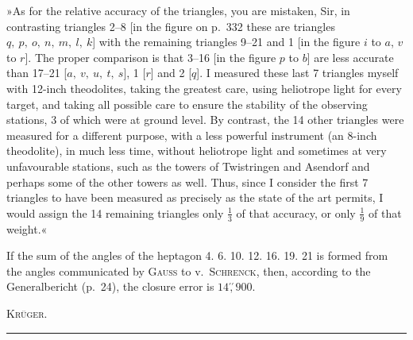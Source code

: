 \par\noindent\hspace*{\parindent}»As for the relative accuracy of the triangles, you are mistaken, Sir, in contrasting triangles 2--8 [in the figure on p.~332 these are triangles \(q,\ p,\ o,\ n,\ m,\ l,\ k\)] with the remaining triangles 9--21 and 1 [in the figure \(i\) to \(a\), \(v\) to \(r\)]. The proper comparison is that 3--16 [in the figure \(p\) to \(b\)] are  less accurate than 17--21 [\(a,\ v,\ u,\ t,\ s\)], 1 [\(r\)] and 2 [\(q\)]. I measured these last 7 triangles myself with 12-inch theodolites, taking the greatest care, using heliotrope light for every target, and taking all possible care to ensure the stability of the observing stations, 3 of which were at ground level. By contrast, the 14 other triangles were measured for a different purpose, with a less powerful instrument (an 8-inch theodolite), in much less time, without heliotrope light and sometimes at very unfavourable stations, such as the towers of Twistringen and Asendorf and perhaps some of the other towers as well. Thus, since I consider the first 7 triangles to have been measured as precisely as the state of the art permits, I would assign the 14 remaining triangles only \(\frac{1}{3}\) of that accuracy, or only \(\frac{1}{9}\) of that weight.«

\par\noindent\hspace*{\parindent}If the sum of the angles of the heptagon 4. 6. 10. 12. 16. 19. 21 is formed from the angles communicated by \textsc{Gauss} to v.~\textsc{Schrenck}, then, according to the Generalbericht (p.~24), the closure error is \(14\overset{\prime\prime}{,}900\).
\begin{flushright}\textsc{Krüger.}\end{flushright}
\begin{center}\rule{.26\textwidth}{.4pt}\end{center}
